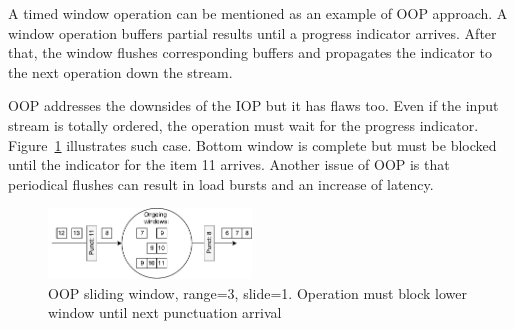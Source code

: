 A timed window operation can be mentioned as an example of OOP approach. A window operation buffers partial results until a progress indicator arrives. After that, the window flushes corresponding buffers and propagates the indicator to the next operation down the stream.

OOP addresses the downsides of the IOP but it has flaws too. Even if the input stream is totally ordered, the operation must wait for the progress indicator. Figure~\ref{oop} illustrates such case. Bottom window is complete but must be blocked until the indicator for the item 11 arrives. Another issue of OOP is that periodical flushes can result in load bursts and an increase of latency. 

\begin{figure}[htbp]
  \centering
  \includegraphics[width=0.48\textwidth]{pics/oop}
  \caption{OOP sliding window, range=3, slide=1. Operation must block lower window until next punctuation arrival }
  \label {oop}
\end{figure}
